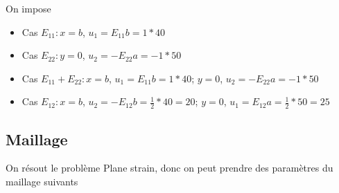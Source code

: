 \documentclass{article}
\begin{document}
On impose 
\begin{itemize}
    \item Cas $E_{11} : x = b$, \; $u_1 = E_{11}b = 1*40$
    \item Cas $E_{22} : y = 0$, \; $u_2 = -E_{22}a = -1*50$
    \item Cas $E_{11}+E_{22} : x = b$, \; $u_1 = E_{11}b = 1*40$; \quad $y = 0$, \; $u_2 = -E_{22}a = -1*50$
    \item Cas $E_{12} :x = b$, \; $u_2 = -E_{12}b = \frac{1}{2}*40 = 20$; \quad $y = 0$, \; $u_1 = E_{12}a = \frac{1}{2}*50 = 25$
\end{itemize}

\subsection{Maillage}
On résout le problème Plane strain, donc on peut prendre des paramètres du maillage suivants
\end{document}
